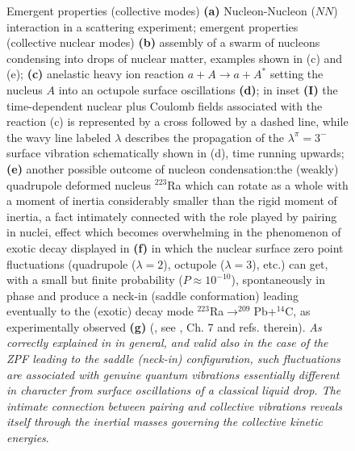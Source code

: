 \begin{figure}
	\caption{Emergent properties (collective modes) \textbf{(a)} Nucleon-Nucleon ($NN$) interaction in a scattering experiment; emergent properties (collective nuclear modes) \textbf{(b)} assembly of a swarm of nucleons condensing into drops of nuclear matter, examples shown in (c) and (e); \textbf{(c)} anelastic heavy ion reaction $a+A\to a+A^*$ setting the nucleus $A$ into an octupole surface oscillations \textbf{(d)}; in inset \textbf{(I)} the time-dependent nuclear plus Coulomb fields associated with the reaction (c) is represented by a cross followed by a dashed line, while the wavy line labeled $\lambda$ describes the propagation of the $\lambda^\pi=3^-$ surface vibration schematically shown in (d), time running upwards; \textbf{(e)} another possible outcome of nucleon condensation:the (weakly) quadrupole deformed nucleus $^{223}$Ra which can rotate as a whole with a moment of inertia considerably smaller than the rigid moment of inertia, a fact intimately connected with the role played by pairing in nuclei, effect which becomes overwhelming in the phenomenon of exotic decay displayed in \textbf{(f)} in which the nuclear  surface zero point fluctuations  (quadrupole ($\lambda=2$), octupole ($\lambda=3$), etc.) can get, with a small but finite probability ($P\approx10^{-10}$), spontaneously in phase and produce a neck-in (saddle conformation) leading eventually to the (exotic) decay mode  $^{223}$Ra$\to^{209}$Pb+$^{14}$C, as experimentally observed \textbf{(g)} (\cite{Rose:84}, see \cite{Brink:05}, Ch. 7 and refs. therein). \textit{As correctly explained in \cite{Matsuyanagi:13} in general, and valid also in the case of the ZPF leading to the saddle (neck-in) configuration, such fluctuations are associated with genuine quantum vibrations essentially different in character from surface oscillations of a classical liquid drop. The intimate connection between pairing and collective vibrations reveals itself through the inertial masses governing the collective kinetic energies}.}
	\label{fig1.0.2}
\end{figure}
